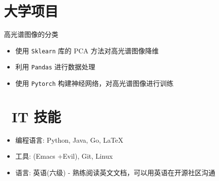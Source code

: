 \documentclass{resume}
\begin{document}
\section{大学项目}
\begin{onehalfspacing}
高光谱图像的分类
\begin{itemize}
  \item 使用 \texttt{Sklearn} 库的 PCA 方法对高光谱图像降维
  \item 利用 \texttt{Pandas} 进行数据处理
  \item 使用 \texttt{Pytorch} 构建神经网络，对高光谱图像进行训练
\end{itemize}
\end{onehalfspacing}

\section{\faCogs\ IT 技能}
\begin{itemize}[parsep=0.5ex]
  \item 编程语言: Python, Java, Go, \LaTeX
  \item 工具: (Emacs +Evil), Git, Linux
  \item 语言: 英语(六级) - 熟练阅读英文文档，可以用英语在开源社区沟通
\end{itemize}

\end{document}
